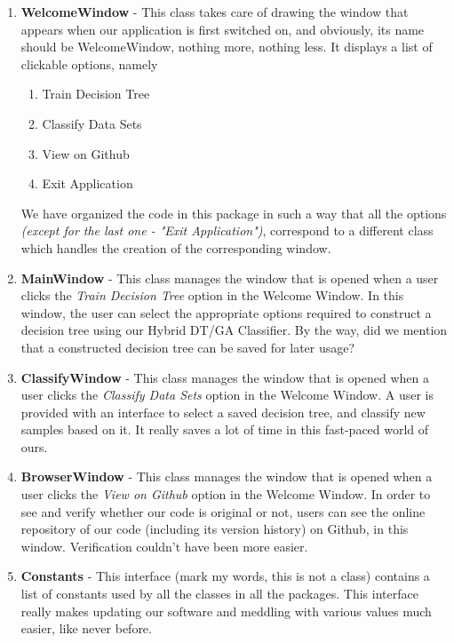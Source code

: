 \documentclass[12pt]{report}
\begin{document}
\begin{enumerate}

\item{\textbf{WelcomeWindow}} - This class takes care of drawing the window that appears when our application is first switched on, and obviously, its name should be WelcomeWindow, nothing more, nothing less. It displays a list of clickable options, namely
\begin{enumerate}
\item{Train Decision Tree}
\item{Classify Data Sets}
\item{View on Github}
\item{Exit Application}
\end{enumerate}

We have organized the code in this package in such a way that all the options \textit{(except for the last one - "Exit Application")}, correspond to a different class which handles the creation of the corresponding window.

\item{\textbf{MainWindow}} - This class manages the window that is opened when a user clicks the \textit{Train Decision Tree} option in the Welcome Window. In this window, the user can select the appropriate options required to construct a decision tree using our Hybrid DT/GA Classifier. By the way, did we mention that a constructed decision tree can be saved for later usage?

\item{\textbf{ClassifyWindow}} - This class manages the window that is opened when a user clicks the \textit{Classify Data Sets} option in the Welcome Window. A user is provided with an interface to select a saved decision tree, and classify new samples based on it. It really saves a lot of time in this fast-paced world of ours.


\item{\textbf{BrowserWindow}} - This class manages the window that is opened when a user clicks the \textit{View on Github} option in the Welcome Window. In order to see and verify whether our code is original or not, users can see the online repository of our code (including its version history) on Github, in this window. Verification couldn't have been more easier. 

\item{\textbf{Constants}} - This interface (mark my words, this is not a class) contains a list of constants used by all the classes in all the packages. This interface really makes updating our software and meddling with various values much easier, like never before.






\end{enumerate}
\end{document}
